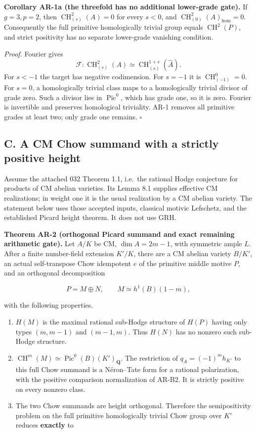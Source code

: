 \documentclass[11pt,a4paper]{article}
\providecommand{\tightlist}{\setlength{\itemsep}{0pt}\setlength{\parskip}{0pt}}
\begin{document}
\textbf{Corollary AR-1a (the threefold has no additional lower-grade
gate).} If \(g=3,p=2\), then \(\operatorname{CH}^2_{(s)}(A)=0\) for
every \(s<0\), and \(\operatorname{CH}^2_{(0)}(A)_{\mathrm{hom}}=0\).
Consequently the full primitive homologically trivial group equals
\(\operatorname{CH}^2(P)\), and strict positivity has no separate
lower-grade vanishing condition.

\emph{Proof.} Fourier gives \[
\mathcal F:\operatorname{CH}^2_{(s)}(A)
 \simeq\operatorname{CH}^{1+s}_{(s)}(\widehat A).
\] For \(s<-1\) the target has negative codimension. For \(s=-1\) it is
\(\operatorname{CH}^0_{(-1)}=0\). For \(s=0\), a homologically trivial
class maps to a homologically trivial divisor of grade zero. Such a
divisor lies in \(\operatorname{Pic}^0\), which has grade one, so it is
zero. Fourier is invertible and preserves homological triviality. AR-1
removes all primitive grades at least two; only grade one remains.
\(\square\)

\subsection{C. A CM Chow summand with a strictly positive
height}\label{c.-a-cm-chow-summand-with-a-strictly-positive-height}

Assume the attached 032 Theorem 1.1, i.e.~the rational Hodge conjecture
for products of CM abelian varieties. Its Lemma 8.1 supplies effective
CM realizations; in weight one it is the usual realization by a CM
abelian variety. The statement below uses those accepted inputs,
classical motivic Lefschetz, and the established Picard height theorem.
It does not use GRH.

\textbf{Theorem AR-2 (orthogonal Picard summand and exact remaining
arithmetic gate).} Let \(A/K\) be CM, \(\dim A=2m-1\), with symmetric
ample \(L\). After a finite number-field extension \(K'/K\), there are a
CM abelian variety \(B/K'\), an actual self-transpose Chow idempotent
\(e\) of the primitive middle motive \(P\), and an orthogonal
decomposition

\[
P=M\oplus N,\qquad M\simeq h^1(B)(1-m),
\tag{AR.4}
\]

with the following properties.

\begin{enumerate}
\def\labelenumi{\arabic{enumi}.}
\tightlist
\item
  \(H(M)\) is the maximal rational sub-Hodge structure of \(H(P)\)
  having only types \((m,m-1)\) and \((m-1,m)\). Thus \(H(N)\) has no
  nonzero such sub-Hodge structure.
\item
  \(\operatorname{CH}^m(M)\simeq\operatorname{Pic}^0(B)(K')_{\mathbf Q}\).
  The restriction of \(q_A=(-1)^m h_{K'}\) to this full Chow summand is
  a Néron--Tate form for a rational polarization, with the positive
  comparison normalization of AR-B2. It is strictly positive on every
  nonzero class.
\item
  The two Chow summands are height orthogonal. Therefore the
  semipositivity problem on the full primitive homologically trivial
  Chow group over \(K'\) reduces \textbf{exactly} to
\end{enumerate}
\end{document}
